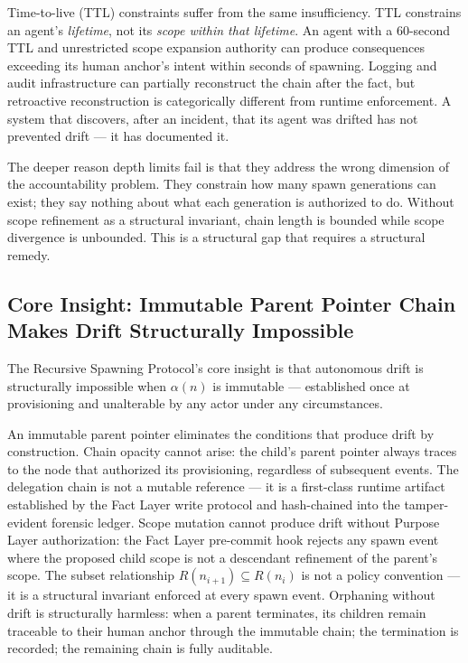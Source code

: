 Time-to-live (TTL) constraints suffer from the same insufficiency. TTL constrains an agent's \emph{lifetime}, not its \emph{scope within that lifetime}. An agent with a 60-second TTL and unrestricted scope expansion authority can produce consequences exceeding its human anchor's intent within seconds of spawning. Logging and audit infrastructure can partially reconstruct the chain after the fact, but retroactive reconstruction is categorically different from runtime enforcement. A system that discovers, after an incident, that its agent was drifted has not prevented drift — it has documented it.

The deeper reason depth limits fail is that they address the wrong dimension of the accountability problem. They constrain how many spawn generations can exist; they say nothing about what each generation is authorized to do. Without scope refinement as a structural invariant, chain length is bounded while scope divergence is unbounded. This is a structural gap that requires a structural remedy.

\subsection{Core Insight: Immutable Parent Pointer Chain Makes Drift Structurally Impossible}

The Recursive Spawning Protocol's core insight is that autonomous drift is structurally impossible when $\alpha(n)$ is immutable — established once at provisioning and unalterable by any actor under any circumstances.

An immutable parent pointer eliminates the conditions that produce drift by construction. Chain opacity cannot arise: the child's parent pointer always traces to the node that authorized its provisioning, regardless of subsequent events. The delegation chain is not a mutable reference — it is a first-class runtime artifact established by the Fact Layer write protocol and hash-chained into the tamper-evident forensic ledger. Scope mutation cannot produce drift without Purpose Layer authorization: the Fact Layer pre-commit hook rejects any spawn event where the proposed child scope is not a descendant refinement of the parent's scope. The subset relationship $R(n_{i+1}) \subseteq R(n_i)$ is not a policy convention — it is a structural invariant enforced at every spawn event. Orphaning without drift is structurally harmless: when a parent terminates, its children remain traceable to their human anchor through the immutable chain; the termination is recorded; the remaining chain is fully auditable.

